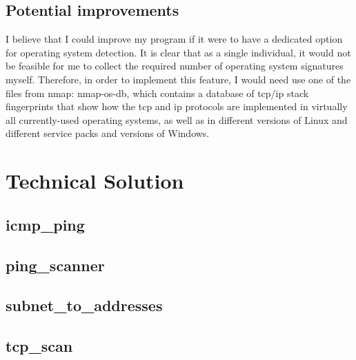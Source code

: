 \documentclass[titlepage]{article}
\let\Oldsection\section{}
\renewcommand{\section}{\clearpage\FloatBarrier\Oldsection}
\let\Oldsubsection\subsection{}
\renewcommand{\subsection}{\FloatBarrier\Oldsubsection}
\begin{document}
\subsection{Potential improvements}
I believe that I could improve my program if it were to have a dedicated option for operating
system detection. 
It is clear that as a single individual, it would not be feasible for me to collect the required
number of operating system signatures myself. Therefore, in order to implement this feature,
I would need use one of the files from nmap: nmap-os-db, which contains
a database of \gls{tcp}/\gls{ip} stack fingerprints that show how the \gls{tcp} and \gls{ip}
protocols are implemented in virtually all currently-used operating systems, as well as in different
versions of Linux and different service packs and versions of Windows.

\clearpage
\appendix

\section{Technical Solution}\label{code}
\lstset{language=Python}
\subsection{icmp\_ping}\label{app:icmpping}



\subsection{ping\_scanner}\label{app:pingscanner}


\subsection{subnet\_to\_addresses}\label{app:subnettoaddresses}


\subsection{tcp\_scan}\label{app:tcpscan}
\end{document}
